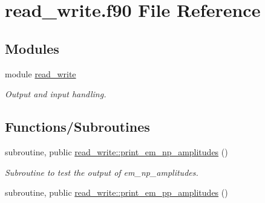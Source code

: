 \hypertarget{read__write_8f90}{}\section{read\+\_\+write.\+f90 File Reference}
\label{read__write_8f90}
\subsection*{Modules}
\begin{DoxyCompactItemize}
\item 
module \hyperlink{namespaceread__write}{read\+\_\+write}
\begin{DoxyCompactList}\small\item\em Output and input handling. \end{DoxyCompactList}\end{DoxyCompactItemize}
\subsection*{Functions/\+Subroutines}
\begin{DoxyCompactItemize}
\item 
subroutine, public \hyperlink{namespaceread__write_a730f5d68add5c828fda48d2408f8c275}{read\+\_\+write\+::print\+\_\+em\+\_\+np\+\_\+amplitudes} ()
\begin{DoxyCompactList}\small\item\em Subroutine to test the output of em\+\_\+np\+\_\+amplitudes. \end{DoxyCompactList}\item 
subroutine, public \hyperlink{namespaceread__write_a72cf75ecd9db83c3514541af9b3bf5b6}{read\+\_\+write\+::print\+\_\+em\+\_\+pp\+\_\+amplitudes} ()
\end{DoxyCompactItemize}
